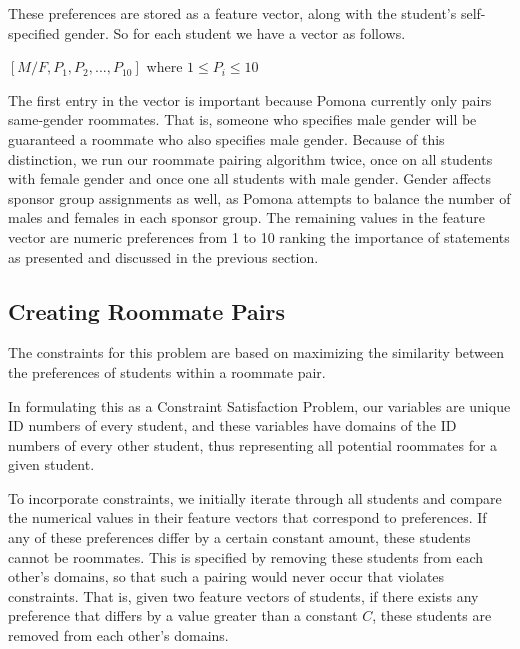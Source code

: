 \documentclass[letterpaper]{article}
\begin{document}
These preferences are stored as a feature vector, along with the student's self-specified gender. So for each student we have a vector as follows.

\begin{center}
	$[M/F, P_1, P_2, ..., P_{10}]$ where $1 \leq P_i \leq 10$
\end{center}

The first entry in the vector is important because Pomona currently only pairs same-gender roommates. That is, someone who specifies male gender will be guaranteed a roommate who also specifies male gender. Because of this distinction, we run our roommate pairing algorithm twice, once on all students with female gender and once one all students with male gender. Gender affects sponsor group assignments as well, as Pomona attempts to balance the number of males and females in each sponsor group. The remaining values in the feature vector are numeric preferences from 1 to 10 ranking the importance of statements as presented and discussed in the previous section. 

\subsection{Creating Roommate Pairs}

The constraints for this problem are based on maximizing the similarity between the preferences of students within a roommate pair.

In formulating this as a Constraint Satisfaction Problem, our variables are unique ID numbers of every student, and these variables have domains of the ID numbers of every other student, thus representing all potential roommates for a given student. 

To incorporate constraints, we initially iterate through all students and compare the numerical values in their feature vectors that correspond to preferences. If any of these preferences differ by a certain constant amount, these students cannot be roommates. This is specified by removing these students from each other's domains, so that such a pairing would never occur that violates constraints. That is, given two feature vectors of students, if there exists any preference that differs by a value greater than a constant $C$, these students are removed from each other's domains.
\end{document}
